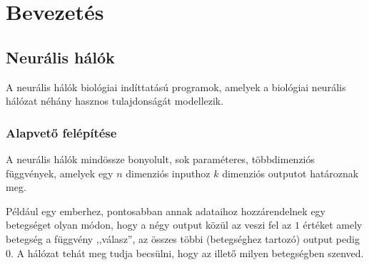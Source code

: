 %
%
%
%
%
%
%
%


\chapter{Bevezetés}



\section{Neurális hálók}

A neurális hálók biológiai indíttatású programok, amelyek a biológiai neurális hálózat néhány hasznos tulajdonságát modellezik.

\subsection{Alapvető felépítése}

A neurális hálók mindössze bonyolult, sok paraméteres, többdimenziós függvények, amelyek egy $n$ dimenziós inputhoz $k$ dimenziós outputot határoznak meg.

Például egy emberhez, pontosabban annak adataihoz hozzárendelnek egy betegséget olyan módon, hogy a négy output közül az veszi fel az $1$ értéket amely betegség a függvény ,,válasz'', az összes többi (betegséghez tartozó) output pedig $0$. A hálózat tehát meg tudja becsülni, hogy az illető milyen betegségben szenved.

